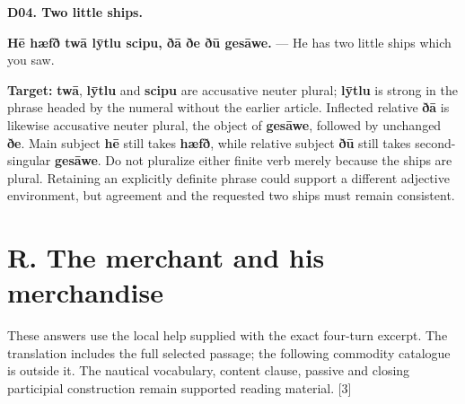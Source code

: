 \par\begin{minipage}{\linewidth}\raggedright
\textbf{D04. Two little ships.}

\textbf{Hē hæfð twā lȳtlu scipu, ðā ðe ðū gesāwe.} — He has two little ships which you saw.

\textbf{Target:} \textbf{twā}, \textbf{lȳtlu} and \textbf{scipu} are accusative neuter plural; \textbf{lȳtlu} is strong in the phrase headed by the numeral without the earlier article. Inflected relative \textbf{ðā} is likewise accusative neuter plural, the object of \textbf{gesāwe}, followed by unchanged \textbf{ðe}. Main subject \textbf{hē} still takes \textbf{hæfð}, while relative subject \textbf{ðū} still takes second-singular \textbf{gesāwe}. Do not pluralize either finite verb merely because the ships are plural. Retaining an explicitly definite phrase could support a different adjective environment, but agreement and the requested two ships must remain consistent.

\end{minipage}\par\addvspace{4pt}

\section*{R. The merchant and his merchandise}

These answers use the local help supplied with the exact four-turn excerpt. The translation includes the full selected passage; the following commodity catalogue is outside it. The nautical vocabulary, content clause, passive and closing participial construction remain supported reading material. [3]

